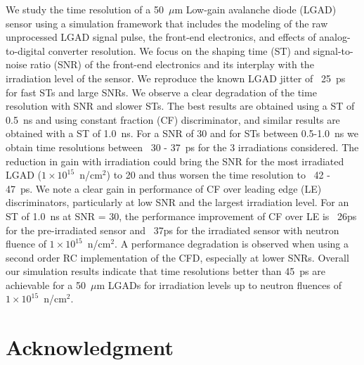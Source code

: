 \documentclass[preprint,1p]{elsarticle}
\begin{document}
We study the time resolution of a 50~$\mu$m Low-gain avalanche diode (LGAD) sensor using a simulation framework that includes the
modeling of the raw unprocessed LGAD signal pulse, the front-end electronics, and effects of analog-to-digital converter resolution.
We focus on the shaping time (ST) and signal-to-noise ratio (SNR) of the front-end electronics and its interplay
with the irradiation level of the sensor. We reproduce the known LGAD jitter of ~25~\si{ps}
for fast STs and large SNRs. We observe a clear degradation of the time resolution with SNR and slower STs. The best results are
obtained using a ST of 0.5~\si{ns} and using constant fraction (CF) discriminator, and similar results are obtained with a ST of 1.0~\si{ns}. For a SNR of 30
and for STs between 0.5-1.0~\si{ns} we obtain time resolutions between ~30 - 37~\si{ps} for the 3 irradiations considered. The
reduction in gain with irradiation could bring the SNR for the most irradiated LGAD ($1\times 10^{15}$~n/cm$^2$) to 20 and thus
worsen the time resolution to ~42 - 47~\si{ps}. We note a clear gain in performance of CF over leading edge (LE) discriminators, particularly at
low SNR and the largest irradiation level. For an ST of 1.0~\si{ns} at SNR = 30, the performance improvement of CF over LE
is ~26\si{ps} for the pre-irradiated sensor and ~37\si{ps} for the irradiated sensor with neutron fluence of
$1\times 10^{15}$~n/cm$^2$. A performance degradation is observed when using a {\color{red}second order RC} implementation of the CFD,
especially at lower SNRs. Overall our simulation results indicate that time resolutions better than
45~\si{ps} are achievable for a 50~$\mu$m LGADs for irradiation levels up to neutron fluences of $1\times 10^{15}$~n/cm$^2$.


\section*{Acknowledgment}

\end{document}
